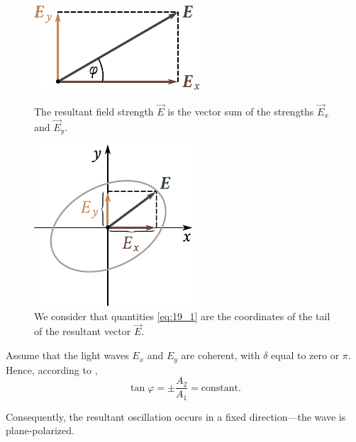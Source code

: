 \begin{figure}[t]
	\begin{minipage}[t]{0.48\linewidth}
		\begin{center}
			\includegraphics[scale=1]{figures/ch_19/fig_19_1.pdf}
            \caption[]{The resultant field strength $\vec{E}$ is the vector sum of the strengths $\vec{E}_x$ and $\vec{E}_y$.}
			\label{fig:19_1}
		\end{center}
	\end{minipage}
	\hfill{ }%
	\begin{minipage}[t]{0.48\linewidth}
		\begin{center}
			\includegraphics[scale=1]{figures/ch_19/fig_19_2.pdf}
			\caption[]{We consider that quantities \eqref{eq:19_1} are the coordinates of the tail of the resultant vector $\vec{E}$.}
			\label{fig:19_2}
		\end{center}
	\end{minipage}
\vspace{-0.4cm}
\end{figure}

Assume that the light waves $E_x$ and $E_y$ are coherent, with $\delta$ equal to zero or $\pi$.
Hence, according to ,
\begin{equation*}
	\tan\varphi = \pm \frac{A_2}{A_1} = \text{constant}.
\end{equation*}

\noindent
Consequently, the resultant oscillation occurs in a fixed direction---the wave is plane-polarized.

